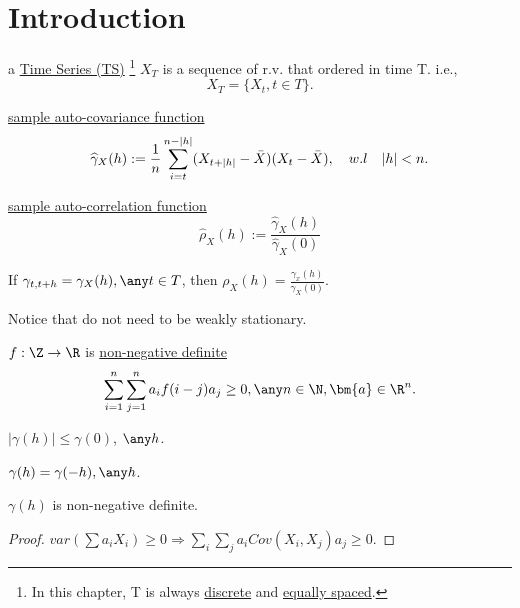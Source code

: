 \section{Introduction}

\begin{definition}
a \uline{Time Series (TS)}
\footnote{In this chapter, T is always \uline{discrete} and \uline{equally spaced}.} 
$X_T$ is a sequence of r.v. that ordered in time T. i.e., 
\[
    X_T = \{X_t, t\in T\}.
\]

\end{definition}

\begin{definition}
\uline{sample auto-covariance function} 
\[
    \widehat{\gamma}_X (h) := \frac{1}{n} \sum_{i=t}^{n-|h|} (X_{t+|h|} - \Bar{X}) (X_t - \Bar{X}),  \quad w.l \quad |h| < n.
\]
\end{definition}

\begin{definition}
\uline{sample auto-correlation function}
\[
    \widehat{\rho}_X (h) := \frac{\widehat{\gamma}_X (h)}{\widehat{\gamma}_X (0)}
\]
\end{definition}

\begin{lemma}
If $\gamma_{t, t+ h} = \gamma_X(h), \any t\in T$,  then $\rho_X(h) = \frac{\gamma_x(h)}{\gamma_X(0)}$.

\noindent Notice that  do not need to be weakly stationary.
\end{lemma}

\begin{definition}
$f: \Z \rightarrow \R$ is \uline{non-negative definite} \iff 
\[
    \sum_{i=1}^n \sum_{j=1}^n a_i f(i-j) a_j \geq 0, \any n\in\N, \bm{a} \in \R^n.
\]

\end{definition}

\begin{property}
\item $|\gamma(h)| \leq \gamma(0)$, $\any h$.
\item $\gamma(h) = \gamma(-h), \any h$.
\item $\gamma(h)$ is non-negative definite.

\begin{proof}
$var(\sum a_i X_i) \geq 0 \Rightarrow \sum_i \sum_j a_i Cov(X_i, X_j) a_j \geq 0.$
\end{proof}
\end{property}

